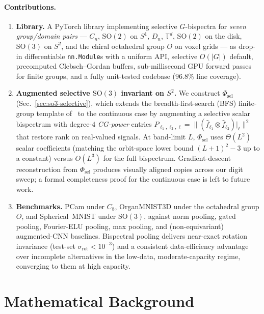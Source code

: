 \documentclass{article}
\theoremstyle{definition}
\theoremstyle{remark}
\newcommand{\SO}{\mathrm{SO}}
\theoremstyle{definition}
\begin{document}
\paragraph{Contributions.}
\begin{enumerate}
  \item \textbf{Library.} A PyTorch library implementing selective
    $G$-bispectra for \emph{seven group/domain pairs} --- $C_n$,
    $\SO(2)$ on $S^1$, $D_n$, $\mathbb{T}^d$, $\SO(2)$ on the disk,
    $\SO(3)$ on $S^2$, and the chiral octahedral group $O$ on voxel
    grids --- as drop-in differentiable \texttt{nn.Module}s with a
    uniform API, selective $O(|G|)$ default, precomputed
    Clebsch--Gordan buffers, sub-millisecond GPU forward passes for
    finite groups, and a fully unit-tested codebase
    (96.8\% line coverage).
  \item \textbf{Augmented selective $\SO(3)$ invariant on $S^2$.}
    We construct $\Phi_{\mathrm{sel}}$ (Sec.~\ref{sec:so3-selective}),
    which extends the breadth-first-search (BFS) finite-group
    template of~\citet{mataigne2024selective} to the continuous case by
    augmenting a selective scalar bispectrum with degree-$4$
    \emph{CG-power} entries
    $P_{\ell_1,\ell_2,\ell} = \lVert (\hat f_{\ell_1} \otimes
    \hat f_{\ell_2})|_\ell \rVert^2$ that restore rank on real-valued
    signals. At band-limit $L$, $\Phi_{\mathrm{sel}}$ uses
    $\Theta(L^2)$ scalar coefficients (matching the orbit-space lower
    bound $(L{+}1)^2 - 3$ up to a constant) versus $O(L^3)$ for the
    full bispectrum. Gradient-descent reconstruction from
    $\Phi_{\mathrm{sel}}$ produces visually aligned copies across our
    digit sweep; a formal completeness proof for the continuous case
    is left to future work.
  \item \textbf{Benchmarks.} PCam under $C_8$, OrganMNIST3D under
    the octahedral group $O$, and Spherical~MNIST under $\SO(3)$,
    against norm pooling, gated pooling, Fourier-ELU pooling, max
    pooling, and (non-equivariant) augmented-CNN baselines.
    Bispectral pooling delivers near-exact rotation invariance
    (test-set $\sigma_{\mathrm{rot}}<10^{-3}$) and a consistent
    data-efficiency advantage over incomplete alternatives in the
    low-data, moderate-capacity regime, converging to them at high
    capacity.
\end{enumerate}

\section{Mathematical Background}
\label{sec:background}
\end{document}
